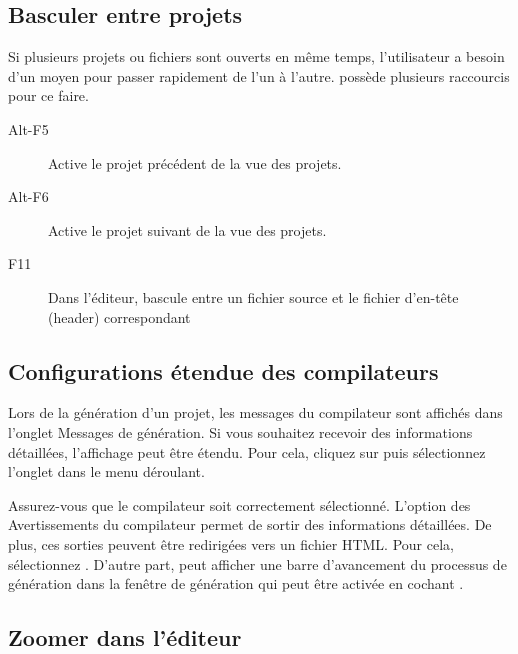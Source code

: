 \subsection{Basculer entre projets}

Si plusieurs projets ou fichiers sont ouverts en même temps, l'utilisateur a besoin d'un moyen pour passer rapidement de l'un à l'autre. \codeblocks possède plusieurs raccourcis pour ce faire.

\begin{description}
\item[Alt-F5] Active le projet précédent de la vue des projets.
\item[Alt-F6] Active le projet suivant de la vue des projets.
\item[F11] Dans l'éditeur, bascule entre un fichier source  et le fichier d'en-tête (header) correspondant 
\end{description}

\subsection{Configurations étendue des compilateurs}

Lors de la génération d'un projet, les messages du compilateur sont affichés dans l'onglet Messages de génération. Si vous souhaitez recevoir des informations détaillées, l'affichage peut être étendu. Pour cela, cliquez sur  puis sélectionnez l'onglet  dans le menu déroulant.


Assurez-vous que le compilateur soit correctement sélectionné. L'option  des Avertissements du compilateur permet de sortir des informations détaillées. De plus, ces sorties peuvent être redirigées vers un fichier HTML. Pour cela, sélectionnez  .
D'autre part, \codeblocks peut afficher une barre d'avancement du processus de génération dans la fenêtre de génération qui peut être activée en cochant .

\subsection{Zoomer dans l'éditeur}

